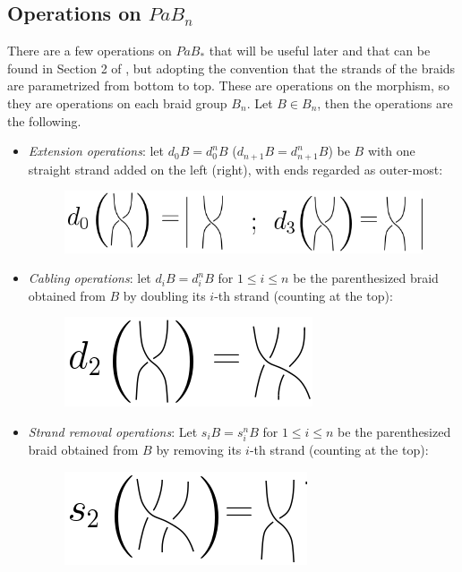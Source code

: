 \documentclass[TFM.tex]{subfiles}
\begin{document}
\subsection{Operations on $PaB_n$}\label{operations}
There are a few operations on $PaB_*$ that will be useful later and that can be found in Section 2 of \cite{1deTamarkin}, but adopting the convention that the strands of the braids are parametrized from bottom to top. These are operations on the morphism, so they are operations on each braid group $B_n$. Let $B\in B_n$, then the operations are the following.

\begin{itemize}
	\item  \emph{Extension operations}: let $d_0B = d^n_0	B$ ($d_{n+1}B = d^n_{n+1}B$) be $B$ with one straight strand
	added on the left (right), with ends regarded as outer-most:
	\begin{figure}[h!]
		\includegraphics[scale=0.5]{Imagenes/extension}
	\end{figure}
	
	\item \emph{Cabling operations}: let $d_iB = d^n_i B$ for $1 ≤ i ≤ n$ be the parenthesized braid obtained
from $B$ by doubling its $i$-th strand (counting at the top):
\begin{figure}[h!]
		\includegraphics[scale=0.5]{Imagenes/cabling}
	\end{figure}
	
	\item \emph{Strand removal operations}: Let $s_iB = s^n_i B$ for $1 ≤ i ≤ n$ be the parenthesized braid
obtained from $B$ by removing its $i$-th strand (counting at the top):
	\begin{figure}[h!]
		\includegraphics[scale=0.5]{Imagenes/removal}
	\end{figure}
	
\end{itemize}
\end{document}
